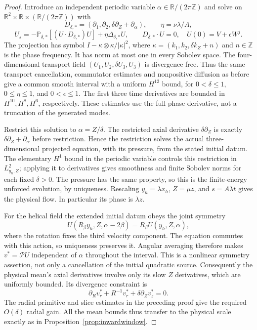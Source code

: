\documentclass[11pt]{article}
\theoremstyle{remark}
\newcommand{\R}{\mathbb R}
\newcommand{\PP}{\mathcal P}
\begin{document}
\begin{proof}
Introduce an independent periodic variable
$\alpha\in\R/(2\pi\mathbb Z)$ and solve on
$\R^2\times\R\times(\R/(2\pi\mathbb Z))$ with
\[
 D_{\delta,*}=(\partial_1,\partial_2,
                   \delta\partial_Z+\partial_\alpha),\qquad
 \eta=\nu\lambda/A,
\]
\[
 U_s=-\mathbb P_{\delta,*}[(U\cdot D_{\delta,*})U]
                 +\eta\Delta_{\delta,*}U,\qquad
 D_{\delta,*}\cdot U=0,
 \quad U(0)=V+\epsilon W^j.
\]
The projection has symbol
$I-\kappa\otimes\kappa/|\kappa|^2$, where
$\kappa=(k_1,k_2,\delta k_Z+n)$ and $n\in\mathbb Z$ is the
phase frequency. It has norm at most one in every Sobolev space.
The four-dimensional transport field
$(U_1,U_2,\delta U_3,U_3)$ is divergence free. Thus the same
transport cancellation, commutator estimates and nonpositive diffusion
as before give a common smooth interval with a uniform $H^{12}$ bound,
for $0<\delta\leq1$, $0\leq\eta\leq1$, and $0<\epsilon\leq1$.
The first three time derivatives are bounded in $H^{10},H^8,H^6$,
respectively. These estimates use the full phase derivative, not a
truncation of the generated modes.

Restrict this solution to $\alpha=Z/\delta$.
The restricted axial derivative $\delta\partial_Z$ is exactly
$\delta\partial_Z+\partial_\alpha$ before restriction. Hence the
restriction solves the actual three-dimensional projected equation,
with its pressure, from the stated initial datum. The elementary
$H^1$ bound in the periodic variable controls this restriction in
$L^2_{y_h,Z}$; applying it to derivatives gives smoothness and finite
Sobolev norms for each fixed $\delta>0$. The pressure has the same
property, so this is the finite-energy unforced evolution, by uniqueness.
Rescaling $y_h=\lambda x_h$, $Z=\mu z$, and $s=A\lambda t$
gives the physical flow. In particular its phase is $\lambda z$.

For the helical field the extended initial datum obeys the joint
symmetry
\[
 U(R_\beta y_h,Z,\alpha-2\beta)
                  =R_\beta U(y_h,Z,\alpha),
\]
where the rotation fixes the third velocity component. The equation
commutes with this action, so uniqueness preserves it. Angular
averaging therefore makes $v^*=\PP U$ independent of $\alpha$
throughout the interval. This is a nonlinear symmetry assertion, not
only a cancellation of the initial quadratic source.
Consequently the physical mean's axial derivatives involve only its
slow $Z$ derivatives, which are uniformly bounded. Its divergence
constraint is
\[
 \partial_Rv^*_r+R^{-1}v^*_r+\delta\partial_Zv^*_z=0.
\]
The radial primitive and slice estimates in the preceding proof give
the required $O(\delta)$ radial gain. All the mean bounds thus transfer
to the physical scale exactly as in
Proposition~\ref{prop:inwardwindow}.


\end{proof}
\end{document}
